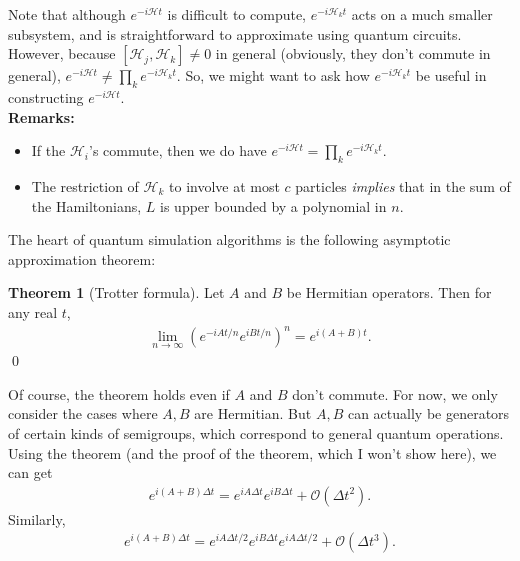 \documentclass{book}
\theoremstyle{definition}
\newtheorem{thm}{Theorem}[section]
\newcommand{\had}{\mathcal{H}}
\newcommand{\lp}{\left(}
\newcommand{\rp}{\right)}
\begin{document}
Note that although $e^{-i\had t}$ is difficult to compute, $e^{-i\had_k t}$ acts on a much smaller subsystem, and is straightforward to approximate using quantum circuits. However, because $[\had_j, \had_k] \neq 0$ in general (obviously, they don't commute in general), $e^{-i\had t} \neq \prod_k e^{-i \had_k t}$. So, we might want to ask how $e^{-i\had_k t}$ be useful in constructing $e^{-i\had t}$. \\

\textbf{Remarks:}
\begin{itemize}
	\item If the $\had_i$'s commute, then we do have $e^{-i \had t} = \prod_k e^{-i \had_k t}$. 
	
	\item The restriction of $\had_k$ to involve at most $c$ particles \textit{implies} that in the sum of the Hamiltonians, $L$ is upper bounded by a polynomial in $n$. 
\end{itemize}



The heart of quantum simulation algorithms is the following asymptotic approximation theorem:
\begin{thm}[Trotter formula]
	Let $A$ and $B$ be Hermitian operators. Then for any real $t$, 
	\begin{align}
	\lim_{n\to \infty}\lp e^{-iAt/n}e^{iBt/n} \rp^n = e^{i(A+B)t}.
	\end{align}\qed
\end{thm}



Of course, the theorem holds even if $A$ and $B$ don't commute. For now, we only consider the cases where $A,B$ are Hermitian. But $A,B$ can actually be generators of certain kinds of semigroups, which correspond to general quantum operations.\\

Using the theorem (and the proof of the theorem, which I won't show here), we can get
\begin{align}
e^{i(A+B)\Delta t} = e^{iA \Delta t}e^{i B\Delta t} + \mathcal{O}(\Delta t^2).
\end{align}
Similarly, 
\begin{align}
e^{i(A+B)\Delta t} = e^{iA\Delta t/2}e^{iB \Delta t}e^{iA \Delta t/2} + \mathcal{O}(\Delta t^3). 
\end{align}
\end{document}
